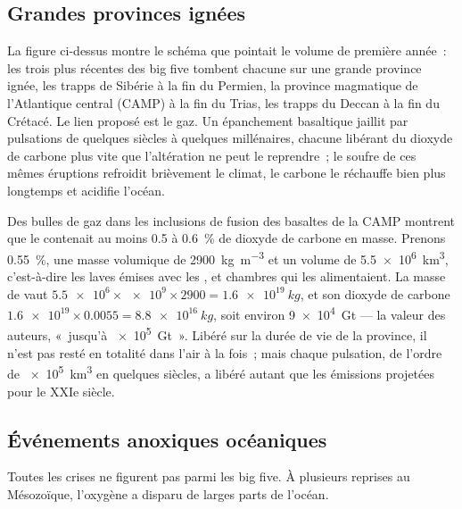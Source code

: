 \subsection*{Grandes provinces ignées}

La figure ci-dessus montre le schéma que pointait le volume de première année~: les trois plus
récentes des big five tombent chacune sur une grande province ignée, les trapps de Sibérie à la
fin du Permien, la province magmatique de l'Atlantique central (CAMP) à la fin du Trias, les
trapps du Deccan à la fin du Crétacé. Le lien proposé est le gaz. Un épanchement basaltique
jaillit par pulsations de quelques siècles à quelques millénaires, chacune libérant du dioxyde de
carbone plus vite que l'altération ne peut le reprendre~; le soufre de ces mêmes éruptions
refroidit brièvement le climat, le carbone le réchauffe bien plus longtemps et acidifie l'océan.

\begin{example}\label{ex:b2:phanerozoic-earth:camp}
Des bulles de gaz dans les inclusions de fusion des basaltes de la CAMP montrent que le  contenait au moins 0.5 à
\qty{0.6}{\percent} de dioxyde de carbone en masse. Prenons \qty{0.55}{\percent}, une masse volumique de
\qty{2900}{kg.m^{-3}} et un volume de \qty{5.5e6}{km^3}, c'est-à-dire les laves émises avec les , 
et chambres qui les alimentaient. La masse de  vaut $\num{5.5e6} \times \num{e9} \times 2900 =
\qty{1.6e19}{kg}$, et son dioxyde de carbone $\num{1.6e19} \times 0.0055 = \qty{8.8e16}{kg}$, soit environ
\qty{9e4}{Gt} --- la valeur des auteurs, «~jusqu'à \qty{e5}{Gt}~». Libéré sur la durée de vie de la province, il
n'est pas resté en totalité dans l'air à la fois~; mais chaque pulsation, de l'ordre de \qty{e5}{km^3} en quelques
siècles, a libéré autant que les émissions projetées pour le XXIe siècle.
\end{example}

\subsection*{Événements anoxiques océaniques}

Toutes les crises ne figurent pas parmi les big five. À plusieurs
reprises au Mésozoïque, l'oxygène a disparu de larges parts de l'océan.

